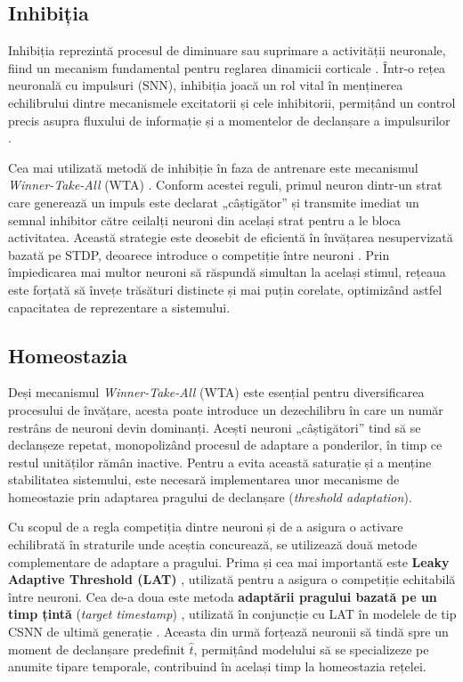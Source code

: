 \subsection*{Inhibiția}

Inhibiția reprezintă procesul de diminuare sau suprimare a activității neuronale, fiind un mecanism fundamental pentru reglarea dinamicii corticale \cite{silberberg2007disynaptic}. Într-o rețea neuronală cu impulsuri (SNN), inhibiția joacă un rol vital în menținerea echilibrului dintre mecanismele excitatorii și cele inhibitorii, permițând un control precis asupra fluxului de informație și a momentelor de declanșare a impulsurilor \cite{zhao2022backeisnn}.

Cea mai utilizată metodă de inhibiție în faza de antrenare este mecanismul \textit{Winner-Take-All} (WTA) \cite{querlioz2011simulation, chen2017mechanisms}. Conform acestei reguli, primul neuron dintr-un strat care generează un impuls este declarat „câștigător” și transmite imediat un semnal inhibitor către ceilalți neuroni din același strat pentru a le bloca activitatea. Această strategie este deosebit de eficientă în învățarea nesupervizată bazată pe STDP, deoarece introduce o competiție între neuroni \cite{ferre2018unsupervised}. Prin împiedicarea mai multor neuroni să răspundă simultan la același stimul, rețeaua este forțată să învețe trăsături distincte și mai puțin corelate, optimizând astfel capacitatea de reprezentare a sistemului.

\subsection*{Homeostazia}

Deși mecanismul \textit{Winner-Take-All} (WTA) este esențial pentru diversificarea procesului de învățare, acesta poate introduce un dezechilibru în care un număr restrâns de neuroni devin dominanți. Acești neuroni „câștigători” tind să se declanșeze repetat, monopolizând procesul de adaptare a ponderilor, în timp ce restul unităților rămân inactive. Pentru a evita această saturație și a menține stabilitatea sistemului, este necesară implementarea unor mecanisme de homeostazie prin adaptarea pragului de declanșare (\textit{threshold adaptation}).

Cu scopul de a regla competiția dintre neuroni și de a asigura o activare echilibrată în straturile unde aceștia concurează, se utilizează două metode complementare de adaptare a pragului. Prima și cea mai importantă este \textbf{Leaky Adaptive Threshold (LAT)} \cite{diehl2015}, utilizată pentru a asigura o competiție echitabilă între neuroni. Cea de-a doua este metoda \textbf{adaptării pragului bazată pe un timp țintă} (\textit{target timestamp}) \cite{falez2019multi}, utilizată în conjuncție cu LAT în modelele de tip CSNN de ultimă generație \cite{falez2019}. Aceasta din urmă forțează neuronii să tindă spre un moment de declanșare predefinit $\hat{t}$, permițând modelului să se specializeze pe anumite tipare temporale, contribuind în același timp la homeostazia rețelei.

